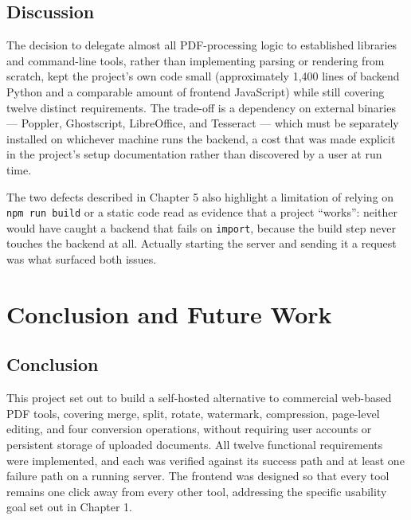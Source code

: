 \documentclass[12pt,a4paper]{report}
\begin{document}
\section{Discussion}
The decision to delegate almost all PDF-processing logic to established libraries and
command-line tools, rather than implementing parsing or rendering from scratch, kept the
project's own code small (approximately 1,400 lines of backend Python and a comparable amount of
frontend JavaScript) while still covering twelve distinct requirements. The trade-off is a
dependency on external binaries --- Poppler, Ghostscript, LibreOffice, and Tesseract --- which
must be separately installed on whichever machine runs the backend, a cost that was made explicit
in the project's setup documentation rather than discovered by a user at run time.

The two defects described in Chapter 5 also highlight a limitation of relying on
\texttt{npm run build} or a static code read as evidence that a project ``works'': neither would
have caught a backend that fails on \texttt{import}, because the build step never touches the
backend at all. Actually starting the server and sending it a request was what surfaced both
issues.

\chapter{Conclusion and Future Work}

\section{Conclusion}
This project set out to build a self-hosted alternative to commercial web-based PDF tools,
covering merge, split, rotate, watermark, compression, page-level editing, and four conversion
operations, without requiring user accounts or persistent storage of uploaded documents. All
twelve functional requirements were implemented, and each was verified against its success path
and at least one failure path on a running server. The frontend was designed so that every tool
remains one click away from every other tool, addressing the specific usability goal set out in
Chapter 1.
\end{document}
